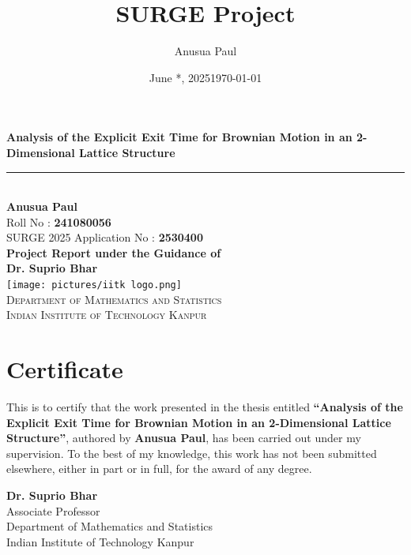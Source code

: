 \documentclass[11pt, a4paper, oneside]{report}
\title{SURGE Project}
\author{Anusua Paul}
\date{June *, 2025}
\title{\ttitle}
\author{\authornames}
\date{\today}
\numberwithin{equation}{section}
\newcommand{\ttitle}{Analysis of the Explicit Exit Time for Brownian Motion in an 
2-Dimensional Lattice Structure}
\newcommand{\authornames}{Anusua Paul}
\newcommand{\supnameA}{Dr. Suprio Bhar}
\newcommand{\univname}{Indian Institute of Technology Kanpur}
\newcommand{\deptname}{Department of Mathematics and Statistics}
\begin{document}
\begin{titlepage}
\begin{center}
    \vspace*{0.5cm}
    
    {\Huge \bfseries \ttitle}\\[0.4cm]
    \rule{0.8\linewidth}{0.8pt} \\[1.2cm]

    
    {\large \textbf{Anusua Paul}}\\[0.1cm]
    Roll No : \textbf{241080056}\\
    SURGE 2025 Application No : \textbf{2530400}\\[1.5cm]

    {\normalsize \textbf{Project Report under the Guidance of}}\\[0.1cm]
    {\normalsize \textbf{Dr. Suprio Bhar}}\\[2cm]

    \texttt{[image: pictures/iitk logo.png]}\\[1cm]

    {\Large \textsc{\deptname}}\\[0.2cm]
    {\Large \textsc{\univname}}\\[2cm]

   

\end{center}
\end{titlepage}


\chapter*{Certificate}

\noindent
This is to certify that the work presented in the thesis entitled \textbf{\enquote{\ttitle}}, authored by \textbf{\authornames}, has been carried out under my supervision. To the best of my knowledge, this work has not been submitted elsewhere, either in part or in full, for the award of any degree.


\vspace{2cm}

\noindent
\begin{minipage}{0.6\textwidth}
\textbf{\supnameA} \\
Associate Professor\\
\deptname\\
\univname
\end{minipage}
\end{document}
